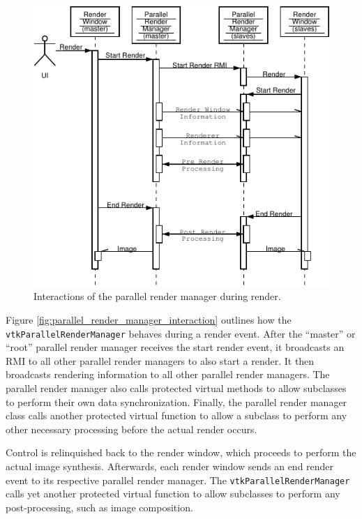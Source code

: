 \documentclass[twocolumn]{article}
\newcommand{\cidentifier}[1]{\texttt{#1}}
\begin{document}
  \begin{figure}
    \begin{center}
      \includegraphics[width=\linewidth]
		      {images/ParallelRenderManagerInteraction}
    \end{center}
    \caption{Interactions of the parallel render manager during render.}
    \label{fig:parallel_render_manager_interaction}
  \end{figure}
  Figure \vref{fig:parallel_render_manager_interaction} outlines how the
  \cidentifier{vtk\-Parallel\-Render\-Manager} behaves during a render
  event.  After the ``master'' or ``root'' parallel render manager receives
  the start render event, it broadcasts an RMI to all other parallel render
  managers to also start a render.  It then broadcasts rendering
  information to all other parallel render managers.  The parallel render
  manager also calls protected virtual methods to allow subclasses to
  perform their own data synchronization.  Finally, the parallel render
  manager class calls another protected virtual function to allow a
  subclass to perform any other necessary processing before the actual
  render occurs.

  Control is relinquished back to the render window, which proceeds to
  perform the actual image synthesis.  Afterwards, each render window sends
  an end render event to its respective parallel render manager.  The
  \cidentifier{vtk\-Parallel\-Render\-Manager} calls yet another protected
  virtual function to allow subclasses to perform any post-processing, such
  as image composition.
\end{document}
